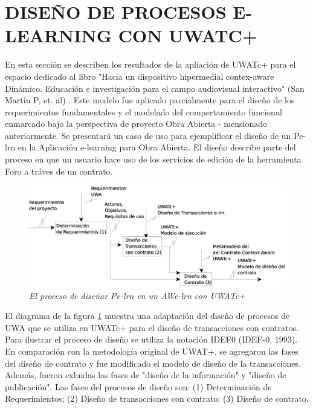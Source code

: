 \documentclass[12 pt,a4paper]{llncs}
\begin{document}
\section {DISEÑO DE PROCESOS E-LEARNING CON UWATC+} \label{diseno}

En esta sección se describen los resultados de la apliación de UWATc+ para el espacio dedicado al libro "Hacia un dispositivo hipermedial contex-aware Dinámico. Educación e investigación para el campo audiovisual interactivo" (San Martín P, et. al) \cite{libro}.  Este  modelo fue aplicado parcialmente para el diseño de los requerimientos fundamentales y el modelado del compertamiento funcional enmarcado bajo la perspectiva de proyecto Obra Abierta - mensionado anteriormente. Se presentará un caso de uso para ejemplificar el diseño de un Pe-lrn en la Aplicación e-learning para Obra Abierta. El diseño describe parte del proceso en que un usuario hace uso de los servicios de edición de la herramienta Foro a tráves de un contrato. 

	\begin{figure}[!h]
        \begin{center}
	\includegraphics[width=6 in,totalheight=2 in]{procesodisenoNuevo.eps}
	\caption{\small \sl El proceso de diseñar Pe-lrn en un AWe-lrn con UWATc+} \label{procesodediseno}
         \end{center}
         \end{figure}



El diagrama de la figura \ref{procesodediseno} muestra una adaptación del diseño de procesos de UWA \cite{UWA} que se utiliza en UWATc+ para el diseño de transacciones con contratos. Para ilustrar el proceso de diseño se utiliza la notación IDEF0 (IDEF-0, 1993). En comparación con la metodología original de UWAT+, se agregaron las fases del diseño de contrato y fue modificado el modelo de diseño de la transacciones. Además, fueron exluidas las fases de "diseño de la información" y "diseño de publicación". Las fases del procesos de diseño son: (1) Determinación de Requerimientos; (2) Diseño de transacciones con contrato; (3) Diseño de contrato.
\end{document}
